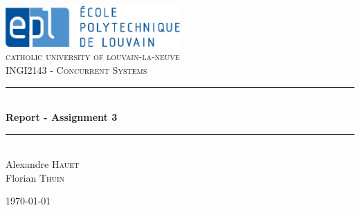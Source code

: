 \documentclass[fleqn]{article}
\newcommand{\HRule}{\rule{\linewidth}{0.5mm}}
\begin{document}
\begin{titlepage}

\begin{center}


\includegraphics[width=0.5\textwidth]{epl-logo.png}\\[1cm]

\textsc{\LARGE catholic university of louvain-la-neuve}\\[1.5cm]

\textsc{\Large INGI2143 - Concurrent Systems}\\[0.5cm]


\HRule \\[0.4cm]
{ \huge \bfseries Report - Assignment 3}\\[0.4cm]

\HRule \\[1.5cm]


{\huge Alexandre \textsc{Hauet} \\[0.6cm] Florian \textsc{Thuin}}


\vfill

{\large \today}

\end{center}

\end{titlepage}










\end{document}
